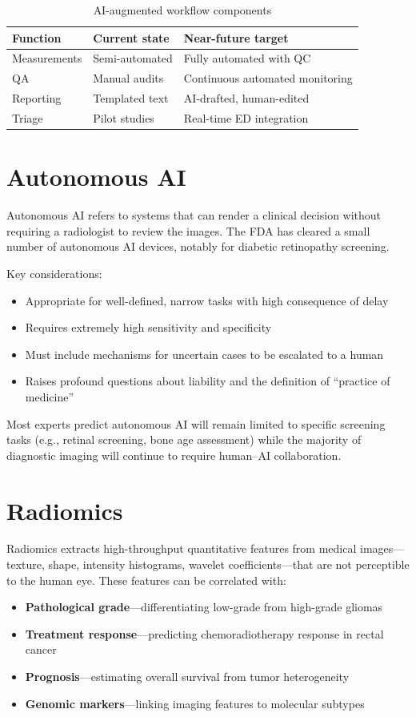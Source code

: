 \begin{table}[h]
\centering
\caption{AI-augmented workflow components}
\begin{tabular}{|l|l|l|}
\hline
\textbf{Function} & \textbf{Current state} & \textbf{Near-future target} \\
\hline
Measurements & Semi-automated & Fully automated with QC \\
\hline
QA & Manual audits & Continuous automated monitoring \\
\hline
Reporting & Templated text & AI-drafted, human-edited \\
\hline
Triage & Pilot studies & Real-time ED integration \\
\hline
\end{tabular}
\end{table}

\section{Autonomous AI}
Autonomous AI refers to systems that can render a clinical decision without requiring a radiologist to review the images. The FDA has cleared a small number of autonomous AI devices, notably for diabetic retinopathy screening.

Key considerations:
\begin{itemize}
    \item Appropriate for well-defined, narrow tasks with high consequence of delay
    \item Requires extremely high sensitivity and specificity
    \item Must include mechanisms for uncertain cases to be escalated to a human
    \item Raises profound questions about liability and the definition of ``practice of medicine''
\end{itemize}

Most experts predict autonomous AI will remain limited to specific screening tasks (e.g., retinal screening, bone age assessment) while the majority of diagnostic imaging will continue to require human--AI collaboration.

\section{Radiomics}
Radiomics extracts high-throughput quantitative features from medical images---texture, shape, intensity histograms, wavelet coefficients---that are not perceptible to the human eye. These features can be correlated with:
\begin{itemize}
    \item \textbf{Pathological grade}---differentiating low-grade from high-grade gliomas
    \item \textbf{Treatment response}---predicting chemoradiotherapy response in rectal cancer
    \item \textbf{Prognosis}---estimating overall survival from tumor heterogeneity
    \item \textbf{Genomic markers}---linking imaging features to molecular subtypes
\end{itemize}

